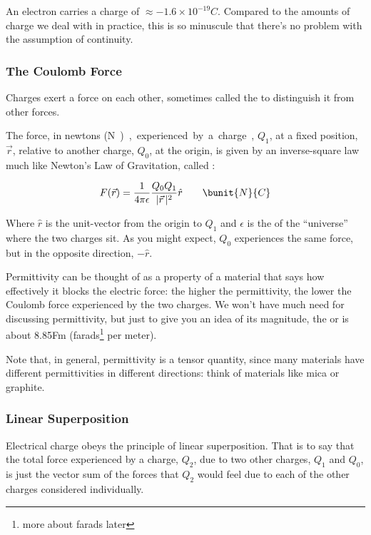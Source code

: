 An electron carries a charge of $\approx
-1.6\times10^{-19}\unit{C}$. Compared to the amounts of charge we deal
with in practice, this is so minuscule that there's no problem with
the assumption of continuity.

\subsubsection{The Coulomb Force}

Charges exert a force on each other, sometimes called the
 to distinguish it from other forces. 

The force, in newtons (\unit N), experienced by a charge, $Q_1$, at a
fixed position, $\vec{r}$, relative to another charge, $Q_0$, at the
origin, is given by an inverse-square law much like Newton's Law of
Gravitation, called :

\begin{equation}
\label{eqn:coulombs}
F(\vec{r}) = \frac{1}{4\pi\epsilon}\frac{Q_0 Q_1}{|\vec{r}\,|^2} \hat{r} \qquad\bunit{N}{C}
\end{equation}

Where $\hat{r}$ is the unit-vector from the origin to $Q_1$ and
$\epsilon$ is the  of the ``universe'' where the
two charges sit. As you might expect, $Q_0$ experiences the same
force, but in the opposite direction, $-\hat{r}$.

Permittivity can be thought of as a property of a material that says
how effectively it blocks the electric force: the higher the
permittivity, the lower the Coulomb force experienced by the two
charges. We won't have much need for discussing permittivity, but just
to give you an idea of its magnitude, the  or  is about 8.85\unit{F}{m}
(farads\footnote{more about farads later} per meter).

Note that, in general, permittivity is a tensor quantity, since many
materials have different permittivities in different directions: think
of materials like mica or graphite.

\subsubsection{Linear Superposition}

Electrical charge obeys the principle of linear superposition. That is
to say that the total force experienced by a charge, $Q_2$, due to two
other charges, $Q_1$ and $Q_0$, is just the vector sum of the forces
that $Q_2$ would feel due to each of the other charges considered
individually.

